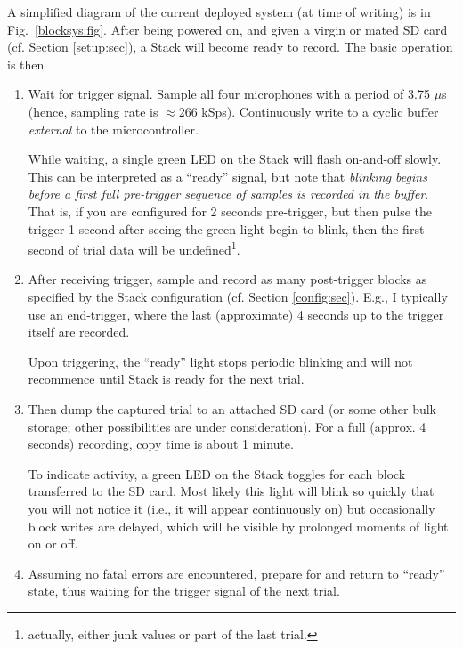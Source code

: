 \documentclass[letterpaper]{article}
\begin{document}
A simplified diagram of the current deployed system (at time of
writing) is in Fig.~\ref{blocksys:fig}. After being powered on, and
given a virgin or mated SD card (cf. Section \ref{setup:sec}), a Stack
will become ready to record. The basic operation is then
\begin{enumerate}
\item Wait for trigger signal. Sample all four microphones with a
  period of 3.75 $\mu$s (hence, sampling rate is $\approx$266
  kSps). Continuously write to a cyclic buffer \textit{external} to
  the microcontroller.

While waiting, a single green LED on the Stack will flash on-and-off
slowly. This can be interpreted as a ``ready'' signal, but note that
\textit{blinking begins before a first full pre-trigger sequence of
  samples is recorded in the buffer}. That is, if you are configured
for 2 seconds pre-trigger, but then pulse the trigger 1 second after
seeing the green light begin to blink, then the first second of trial
data will be undefined\footnote{actually, either junk values or part of the
last trial.}.

\item After receiving trigger, sample and record as many post-trigger
  blocks as specified by the Stack configuration
  (cf. Section \ref{config:sec}). E.g., I typically use an end-trigger, where
  the last (approximate) 4 seconds up to the trigger itself are
  recorded.

Upon triggering, the ``ready'' light stops periodic blinking and will
not recommence until Stack is ready for the next trial.

\item Then dump the captured trial to an attached SD card (or some
  other bulk storage; other possibilities are under consideration). For
  a full (approx. 4 seconds) recording, copy time is about 1 minute.

To indicate activity, a green LED on the Stack toggles for each block
transferred to the SD card. Most likely this light will blink so
quickly that you will not notice it (i.e., it will appear continuously
on) but occasionally block writes are delayed, which will be visible
by prolonged moments of light on or off.

\item Assuming no fatal errors are encountered, prepare for and return
  to ``ready'' state, thus waiting for the trigger signal of the next
  trial.
\end{enumerate}
\end{document}
